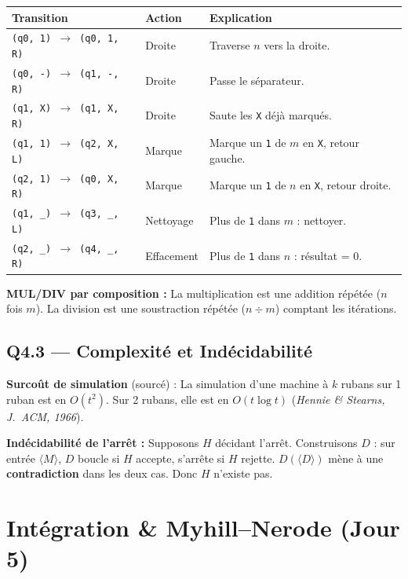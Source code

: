 \documentclass[12pt,a4paper,oneside]{scrartcl}
\begin{document}
\begin{center}
\begin{tabular}{llp{8.5cm}}
    \toprule
    \textbf{Transition} & \textbf{Action} & \textbf{Explication} \\
    \midrule
    \texttt{(q0, 1) $\to$ (q0, 1, R)} & Droite & Traverse $n$ vers la droite. \\
    \texttt{(q0, -) $\to$ (q1, -, R)} & Droite & Passe le séparateur. \\
    \texttt{(q1, X) $\to$ (q1, X, R)} & Droite & Saute les \texttt{X} déjà marqués. \\
    \texttt{(q1, 1) $\to$ (q2, X, L)} & Marque & Marque un \texttt{1} de $m$ en \texttt{X}, retour gauche. \\
    \texttt{(q2, 1) $\to$ (q0, X, R)} & Marque & Marque un \texttt{1} de $n$ en \texttt{X}, retour droite. \\
    \texttt{(q1, \_) $\to$ (q3, \_, L)} & Nettoyage & Plus de \texttt{1} dans $m$ : nettoyer. \\
    \texttt{(q2, \_) $\to$ (q4, \_, R)} & Effacement & Plus de \texttt{1} dans $n$ : résultat = 0. \\
    \bottomrule
\end{tabular}
\end{center}

\textbf{MUL/DIV par composition :} La multiplication est une addition répétée ($n$ fois $m$). La division est une soustraction répétée ($n \div m$) comptant les itérations.

\subsection{Q4.3 — Complexité et Indécidabilité}

\textbf{Surcoût de simulation} (sourcé) : La simulation d'une machine à $k$ rubans sur 1 ruban est en $O(t^2)$. Sur 2 rubans, elle est en $O(t \log t)$ (\textit{Hennie \& Stearns, J.~ACM, 1966}).

\textbf{Indécidabilité de l'arrêt :} Supposons $H$ décidant l'arrêt. Construisons $D$ : sur entrée $\langle M \rangle$, $D$ boucle si $H$ accepte, s'arrête si $H$ rejette. $D(\langle D \rangle)$ mène à une \textbf{contradiction} dans les deux cas. Donc $H$ n'existe pas.

\newpage

\section{Intégration \& Myhill--Nerode (Jour 5)}
\end{document}
